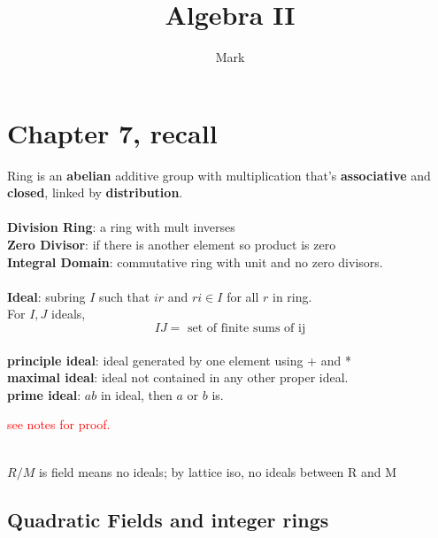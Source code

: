 \documentclass[12pt]{article}
\title{Algebra II}
\author{Mark}
\date{}
\begin{document}
\maketitle

\section*{Chapter 7, recall}
Ring is an \textbf{abelian} additive group with multiplication that's \textbf{associative} and \textbf{closed}, linked by \textbf{distribution}.\\

\ \\
\noindent\textbf{Division Ring}: a ring with mult inverses \\
\textbf{Zero Divisor}: if there is another element so product is zero\\
\textbf{Integral Domain}: commutative ring with unit and no zero divisors.\\

\ \\
\textbf{Ideal}: subring $I$ such that $ir$ and $ri \in I$ for all $r$ in ring.\\
For $I, J$ ideals, 
$$IJ = \text{ set of finite sums of ij}$$
\ \\
\textbf{principle ideal}: ideal generated by one element using + and *\\
\textbf{maximal ideal}: ideal not contained in any other proper ideal.\\
\textbf{prime ideal}: $ab$ in ideal, then $a$ or $b$ is.\\

\centerline{
}
\textcolor{red}{see notes for proof.}


\centerline{}\\
\textcolor[gray]{0.5}{$R / M$ is field means no ideals; by lattice iso, no ideals between R and M}\\


\subsection*{Quadratic Fields and integer rings}
\end{document}
